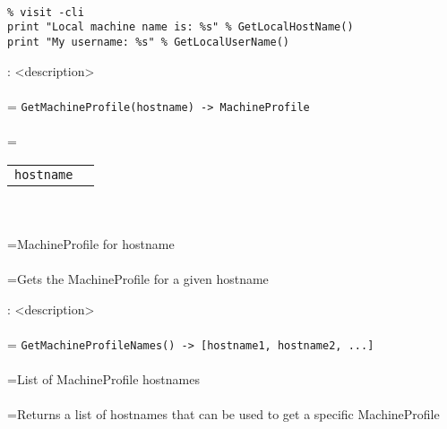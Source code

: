 \documentclass[10pt,a4paper]{report}
\begin{document}
\\[-6mm]
\begin{verbatim}% visit -cli
print "Local machine name is: %s" % GetLocalHostName()
print "My username: %s" % GetLocalUserName()
\end{verbatim}
\newpage


{}
: <description>\\[-3mm]

 \\ 
\hangindent=\parindent 
\verb!GetMachineProfile(hostname) -> MachineProfile!\\ [-3mm]

 \\ 
\hangindent=\parindent 
\begin{tabular}{ll}
\verb!hostname! &  \\
\end{tabular} \\[-2mm]


 \\ 
\hangindent=\parindent MachineProfile for hostname \\[-3mm] 

 \\ 
\hangindent=\parindent Gets the MachineProfile for a given hostname \\[-3mm] 

\newpage


{}
: <description>\\[-3mm]

 \\ 
\hangindent=\parindent 
\verb!GetMachineProfileNames() -> [hostname1, hostname2, ...]!\\ [-3mm]

 \\ 
\hangindent=\parindent List of MachineProfile hostnames \\[-3mm] 

 \\ 
\hangindent=\parindent Returns a list of hostnames that can be used to get a specific MachineProfile \\[-3mm] 

\newpage
\end{document}
